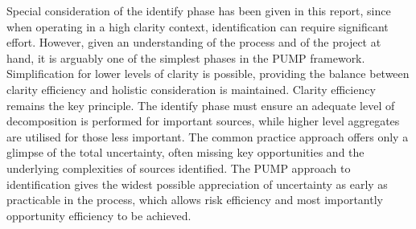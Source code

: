 Special consideration of the identify phase has been given in this report, since when operating in a high clarity context, identification can require significant effort.
However, given an understanding of the process and of the project at hand, it is arguably one of the simplest phases in the PUMP framework.
Simplification for lower levels of clarity is possible, providing the balance between clarity efficiency and holistic consideration is maintained.
Clarity efficiency remains the key principle.
The identify phase must ensure an adequate level of decomposition is performed for important sources, while higher level aggregates are utilised for those less important.
The common practice approach offers only a glimpse of the total uncertainty, often missing key opportunities and the underlying complexities of sources identified.
The PUMP approach to identification gives the widest possible appreciation of uncertainty as early as practicable in the process, which allows risk efficiency and most importantly opportunity efficiency to be achieved.


\clearpage







